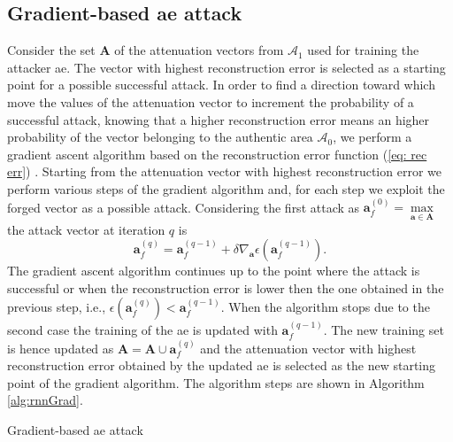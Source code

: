 \documentclass[draftcls,onecolumn,12pt]{IEEEtran}
\begin{document}
\subsection{Gradient-based \ac{ae} attack}
Consider the set $\bm{A}$ of the attenuation vectors from $\mathcal{A}_1$ used for training the attacker \ac{ae}. The vector with highest reconstruction error is selected as a starting point for a possible successful attack. In order to find a direction toward which move the values of the attenuation vector to increment the probability of a successful attack, knowing that a higher reconstruction error means an higher probability of the vector belonging to the authentic area $\mathcal{A}_0$, we perform a gradient ascent algorithm based on the reconstruction error function (\ref{eq: rec err}) . 
Starting from the attenuation vector with highest reconstruction error we perform various steps of the gradient algorithm and, for each step we exploit the forged vector as a possible attack. Considering the first attack as $\bm{a}_f^{(0)}=\underset{\bm{a} \in \bm{A}}{\max}$ the attack vector at iteration $q$ is
\begin{equation}\label{eq: rnn attack}
    \bm{a}_f^{(q)} = \bm{a}_f^{(q-1)}+ \delta \nabla_{\bm{a}}\epsilon(\bm{a}_f^{(q-1)}).
\end{equation}
The gradient ascent algorithm continues up to the point where the attack is successful or when the reconstruction error is lower then the one obtained in the previous step, i.e., $\epsilon(\bm{a}_f^{(q)}) < \bm{a}_f^{(q-1)}$. When the algorithm stops due to the second case the training of the \ac{ae} is updated with $\bm{a}_f^{(q-1)}$. The new training set is hence updated as $\bm{A} = \bm{A} \cup \bm{a}_f^{(q)}$ and the attenuation vector with highest reconstruction error obtained by the updated \ac{ae} is selected as the new starting point of the gradient algorithm. The algorithm steps are shown in Algorithm \ref{alg:rnnGrad}.

\begin{algorithm}[t]
\label{alg:rnnGrad}
  \scriptsize

 

    
 \caption{Gradient-based \ac{ae} attack}
\end{algorithm}
\end{document}
